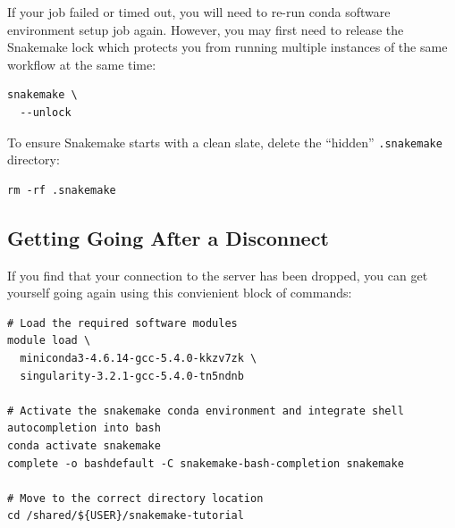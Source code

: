 If your job failed or timed out, you will need to re-run conda software environment setup job again. However, you may first need to release the
Snakemake lock which protects you from running multiple instances of the same workflow at the same time:

\begin{lstlisting}
snakemake \
  --unlock
\end{lstlisting}

To ensure Snakemake starts with a clean slate, delete the ``hidden'' \texttt{.snakemake} directory:

\begin{lstlisting}
rm -rf .snakemake
\end{lstlisting}

\subsection{Getting Going After a Disconnect}

If you find that your connection to the server has been dropped, you can get yourself going again using this convienient block of commands:

\begin{lstlisting}
# Load the required software modules
module load \
  miniconda3-4.6.14-gcc-5.4.0-kkzv7zk \
  singularity-3.2.1-gcc-5.4.0-tn5ndnb

# Activate the snakemake conda environment and integrate shell autocompletion into bash
conda activate snakemake
complete -o bashdefault -C snakemake-bash-completion snakemake

# Move to the correct directory location
cd /shared/${USER}/snakemake-tutorial
\end{lstlisting}
